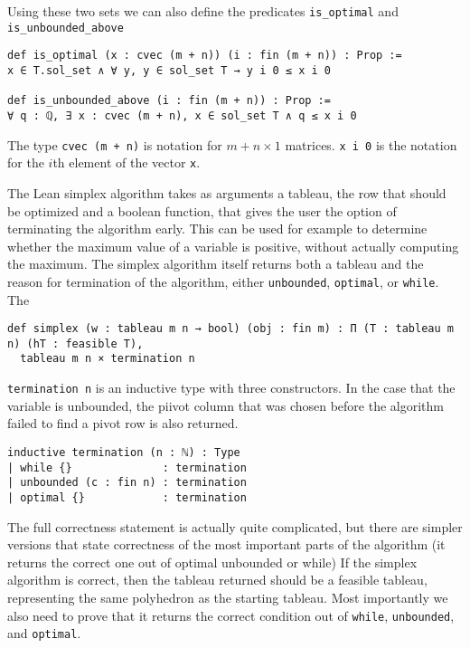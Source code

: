 \documentclass[11pt]{article} %
\begin{document}
Using these two sets we can also define the predicates \lstinline|is_optimal| and \lstinline|is_unbounded_above|
\begin{lstlisting}
def is_optimal (x : cvec (m + n)) (i : fin (m + n)) : Prop :=
x ∈ T.sol_set ∧ ∀ y, y ∈ sol_set T → y i 0 ≤ x i 0

def is_unbounded_above (i : fin (m + n)) : Prop :=
∀ q : ℚ, ∃ x : cvec (m + n), x ∈ sol_set T ∧ q ≤ x i 0
\end{lstlisting}

The type \lstinline|cvec (m + n)| is notation for $m + n \times 1$ matrices. \lstinline|x i 0| is the notation for the $i$th element of the vector  \lstinline|x|.

The Lean simplex algorithm takes as arguments a tableau, the row that should be optimized and a boolean function, that gives the user the option of terminating the algorithm early. This can be used for example to determine whether the maximum value of a variable is positive, without actually computing the maximum. The simplex algorithm itself returns both a tableau and the reason for termination of the algorithm, either \lstinline|unbounded|, \lstinline|optimal|, or \lstinline|while|. The
\begin{lstlisting}
def simplex (w : tableau m n → bool) (obj : fin m) : Π (T : tableau m n) (hT : feasible T),
  tableau m n × termination n
\end{lstlisting}

\lstinline|termination n| is an inductive type with three constructors. In the case that the variable is unbounded, the piivot column that was chosen before the algorithm failed to find a pivot row is also returned.
\begin{lstlisting}
inductive termination (n : ℕ) : Type
| while {}              : termination
| unbounded (c : fin n) : termination
| optimal {}            : termination
\end{lstlisting}

\color{red} The full correctness statement is actually quite complicated, but there are simpler versions that state correctness of the most important parts of the algorithm (it returns the correct one out of optimal unbounded or while)\color{black}
If the simplex algorithm is correct, then the tableau returned should be a feasible tableau, representing the same polyhedron as the starting tableau. Most importantly we also need to prove that it returns the correct condition out of \lstinline|while|, \lstinline|unbounded|, and \lstinline|optimal|.
\end{document}
